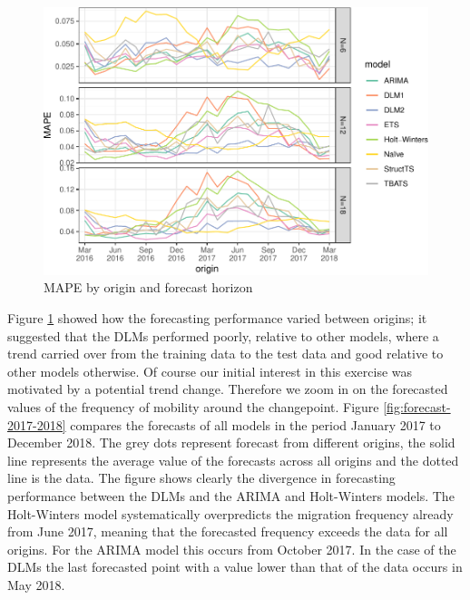 \documentclass[]{article}
\begin{document}
\begin{figure}
\centering
\includegraphics{../figs/freq--rmse-origins-1.pdf}
\caption{\label{fig:rmse-origins}MAPE by origin and forecast horizon}
\end{figure}

Figure \ref{fig:rmse-origins} showed how the forecasting performance
varied between origins; it suggested that the DLMs performed poorly,
relative to other models, where a trend carried over from the training
data to the test data and good relative to other models otherwise. Of
course our initial interest in this exercise was motivated by a
potential trend change. Therefore we zoom in on the forecasted values of
the frequency of mobility around the changepoint. Figure
\ref{fig:forecast-2017-2018} compares the forecasts of all models in the
period January 2017 to December 2018. The grey dots represent forecast
from different origins, the solid line represents the average value of
the forecasts across all origins and the dotted line is the data. The
figure shows clearly the divergence in forecasting performance between
the DLMs and the ARIMA and Holt-Winters models. The Holt-Winters model
systematically overpredicts the migration frequency already from June
2017, meaning that the forecasted frequency exceeds the data for all
origins. For the ARIMA model this occurs from October 2017. In the case
of the DLMs the last forecasted point with a value lower than that of
the data occurs in May 2018.
\end{document}
